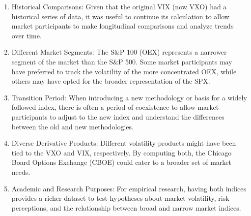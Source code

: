 \documentclass[12pt, a4paper]{article}
\theoremstyle{definition}
\begin{document}
\begin{enumerate}[label = \roman*.]
\item Historical Comparisons: Given that the original VIX (now VXO) had a historical series of data, it was useful to continue its calculation to allow market participants to make longitudinal comparisons and analyze trends over time.

\item Different Market Segments: The S\&P 100 (OEX) represents a narrower segment of the market than the S\&P 500. Some market participants may have preferred to track the volatility of the more concentrated OEX, while others may have opted for the broader representation of the SPX.

\item Transition Period: When introducing a new methodology or basis for a widely followed index, there is often a period of coexistence to allow market participants to adjust to the new index and understand the differences between the old and new methodologies.

\item Diverse Derivative Products: Different volatility products might have been tied to the VXO and VIX, respectively. By computing both, the Chicago Board Options Exchange (CBOE) could cater to a broader set of market needs.

\item Academic and Research Purposes: For empirical research, having both indices provides a richer dataset to test hypotheses about market volatility, risk perceptions, and the relationship between broad and narrow market indices.

\end{enumerate}
\end{document}
